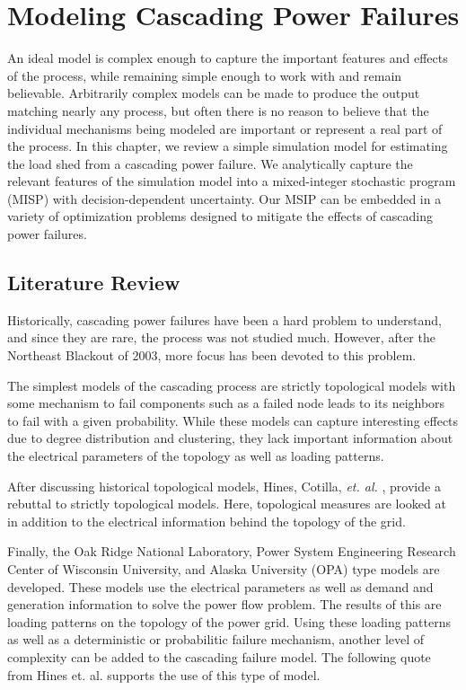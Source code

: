 \newcommand{\mypathmsip}{../thesis/msip}
\newcommand{\mypathmsipdata}{../thesis/msip/data}
\chapter{Modeling Cascading Power Failures}\label{msip-model}
An ideal model is complex enough to capture the important features and effects of the process, while remaining simple enough to work with and remain believable.  Arbitrarily complex models can be made to produce the output matching nearly any process, but often there is no reason to believe that the individual mechanisms being modeled are important or represent a real part of the process.  In this chapter, we review a simple simulation model for estimating the load shed from a cascading power failure.  We analytically capture the relevant features of the simulation model into a mixed-integer stochastic program (MISP) with decision-dependent uncertainty.  Our MSIP can be embedded in a variety of optimization problems designed to mitigate the effects of cascading power failures.

\section{Literature Review}
Historically, cascading power failures have been a hard problem to understand, and since they are rare, the process was not studied much.  However, after the Northeast Blackout of 2003, more focus has been devoted to this problem.  

The simplest models of the cascading process are strictly topological models with some mechanism to fail components such as a failed node leads to its neighbors to fail with a given probability.  While these models can capture interesting effects due to degree distribution and clustering, they lack important information about the electrical parameters of the topology as well as loading patterns.   

After discussing historical topological models, Hines, Cotilla, {\it et. al.} \cite{hines_2010}, \cite{cotilla_2012} provide a rebuttal to strictly topological models.  Here, topological measures are looked at in addition to the electrical information behind the topology of the grid. 

Finally, the Oak Ridge National Laboratory, Power System Engineering Research Center of Wisconsin University, and Alaska University (OPA) type models are developed.  These models use the electrical parameters as well as demand and generation information to solve the power flow problem.  The results of this are loading patterns on the topology of the power grid.  Using these loading patterns as well as a deterministic or probabilitic failure mechanism, another level of complexity can be added to the cascading failure model.  The following quote from Hines et. al. \cite{hines_2011} supports the use of this type of model.

